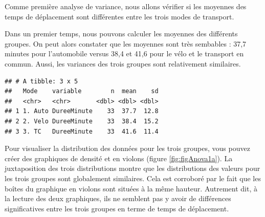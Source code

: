 \documentclass[
  11pt,
  french,
]{book}
\makeatletter
\newenvironment{Shaded}{\begin{snugshade}}{\end{snugshade}}
\newcommand{\CommentTok}[1]{\textcolor[rgb]{0.56,0.35,0.01}{\textit{#1}}}
\newcommand{\DataTypeTok}[1]{\textcolor[rgb]{0.13,0.29,0.53}{#1}}
\newcommand{\KeywordTok}[1]{\textcolor[rgb]{0.13,0.29,0.53}{\textbf{#1}}}
\newcommand{\NormalTok}[1]{#1}
\newcommand{\OperatorTok}[1]{\textcolor[rgb]{0.81,0.36,0.00}{\textbf{#1}}}
\newcommand{\StringTok}[1]{\textcolor[rgb]{0.31,0.60,0.02}{#1}}
\newenvironment{kframe}{%
\medskip{}
\setlength{\fboxsep}{.8em}
 \def\at@end@of@kframe{}%
 \ifinner\ifhmode%
  \def\at@end@of@kframe{\end{minipage}}%
  \begin{minipage}{\columnwidth}%
 \fi\fi%
 \def\FrameCommand##1{\hskip\@totalleftmargin \hskip-\fboxsep
 \colorbox{shadecolor}{##1}\hskip-\fboxsep
     \hskip-\linewidth \hskip-\@totalleftmargin \hskip\columnwidth}%
 \MakeFramed {\advance\hsize-\width
   \@totalleftmargin\z@ \linewidth\hsize
   \@setminipage}}%
 {\par\unskip\endMakeFramed%
 \at@end@of@kframe}
\renewenvironment{Shaded}{\begin{kframe}}{\end{kframe}}
\makeatother
\begin{document}
Comme première analyse de variance, nous allons vérifier si les moyennes des temps de déplacement sont différentes entre les trois modes de transport.

Dans un premier temps, nous pouvons calculer les moyennes des différents groupes. On peut alors constater que les moyennes sont très sembables : 37,7 minutes pour l'automobile versus 38,4 et 41,6 pour le vélo et le transport en commun. Aussi, les variances des trois groupes sont relativement similaires.

\begin{Shaded}
\end{Shaded}

\begin{verbatim}
## # A tibble: 3 x 5
##   Mode    variable        n  mean    sd
##   <chr>   <chr>       <dbl> <dbl> <dbl>
## 1 1. Auto DureeMinute    33  37.7  12.8
## 2 2. Velo DureeMinute    33  38.4  15.2
## 3 3. TC   DureeMinute    33  41.6  11.4
\end{verbatim}

Pour visualiser la distribution des données pour les trois groupes, vous pouvez créer des graphiques de densité et en violons (figure \ref{fig:figAnova1a}). La juxtaposition des trois distributions montre que les distributions des valeurs pour les trois groupes sont globalement similaires. Cela est corroboré par le fait que les boîtes du graphique en violons sont situées à la même hauteur. Autrement dit, à la lecture des deux graphiques, ils ne semblent pas y avoir de différences significatives entre les trois groupes en terme de temps de déplacement.
\end{document}
